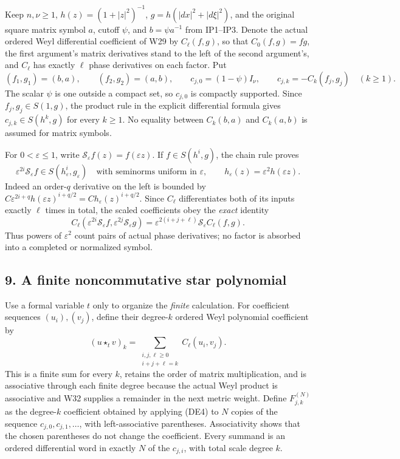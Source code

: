 \documentclass[
  11pt,
]{article}
\begin{document}
Keep \(n,\nu\ge1\), \(h(z)=(1+|z|^2)^{-1}\), \(g=h(|dx|^2+|d\xi|^2)\),
and the original square matrix symbol \(a\), cutoff \(\psi\), and
\(b=\psi a^{-1}\) from IP1--IP3. Denote the actual ordered Weyl
differential coefficient of W29 by \(C_\ell(f,g)\), so that
\(C_0(f,g)=fg\), the first argument's matrix derivatives stand to the
left of the second argument's, and \(C_\ell\) has exactly \(\ell\) phase
derivatives on each factor. Put \[
 (f_1,g_1)=(b,a),\qquad(f_2,g_2)=(a,b),\qquad
 c_{j,0}=(1-\psi)I_\nu,\qquad
 c_{j,k}=-C_k(f_j,g_j)\quad(k\ge1).
 \tag{DE1}
\] The scalar \(\psi\) is one outside a compact set, so \(c_{j,0}\) is
compactly supported. Since \(f_j,g_j\in S(1,g)\), the product rule in
the explicit differential formula gives \(c_{j,k}\in S(h^k,g)\) for
every \(k\ge1\). No equality between \(C_k(b,a)\) and \(C_k(a,b)\) is
assumed for matrix symbols.

For \(0<\varepsilon\le1\), write
\(\mathscr S_\varepsilon f(z)=f(\varepsilon z)\). If \(f\in S(h^i,g)\),
the chain rule proves \[
 \varepsilon^{2i}\mathscr S_\varepsilon f
       \in S(h_\varepsilon^i,g_\varepsilon)
       \quad\text{with seminorms uniform in }\varepsilon,
 \qquad
 h_\varepsilon(z)=\varepsilon^2h(\varepsilon z).
 \tag{DE2}
\] Indeed an order-\(q\) derivative on the left is bounded by
\(C\varepsilon^{2i+q}h(\varepsilon z)^{i+q/2}
=C h_\varepsilon(z)^{i+q/2}\). Since \(C_\ell\) differentiates both of
its inputs exactly \(\ell\) times in total, the scaled coefficients obey
the \emph{exact} identity \[
 C_\ell(\varepsilon^{2i}\mathscr S_\varepsilon f,
          \varepsilon^{2j}\mathscr S_\varepsilon g)
 =\varepsilon^{2(i+j+\ell)}
       \mathscr S_\varepsilon C_\ell(f,g).
 \tag{DE3}
\] Thus powers of \(\varepsilon^2\) count pairs of actual phase
derivatives; no factor is absorbed into a completed or normalized
symbol.

\subsection{9. A finite noncommutative star
polynomial}\label{a-finite-noncommutative-star-polynomial}

Use a formal variable \(t\) only to organize the \emph{finite}
calculation. For coefficient sequences \((u_i),(v_j)\), define their
degree-\(k\) ordered Weyl polynomial coefficient by \[
 (u\star_t v)_k
    =\sum_{\substack{i,j,\ell\ge0\\i+j+\ell=k}}
          C_\ell(u_i,v_j).
 \tag{DE4}
\] This is a finite sum for every \(k\), retains the order of matrix
multiplication, and is associative through each finite degree because
the actual Weyl product is associative and W32 supplies a remainder in
the next metric weight. Define \(F_{j,k}^{(N)}\) as the degree-\(k\)
coefficient obtained by applying (DE4) to \(N\) copies of the sequence
\(c_{j,0},c_{j,1},\ldots\), with left-associative parentheses.
Associativity shows that the chosen parentheses do not change the
coefficient. Every summand is an ordered differential word in exactly
\(N\) of the \(c_{j,i}\), with total scale degree \(k\).
\end{document}
